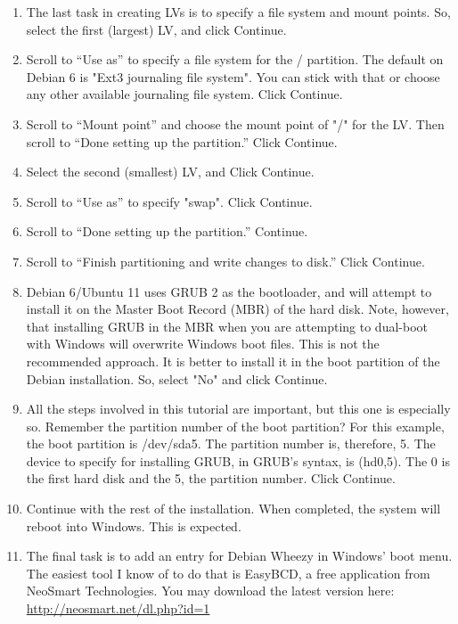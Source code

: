 \documentclass[12pt,notitlepage,onecolumn,oneside,openany]{memoir}
\begin{document}
\begin{enumerate}
\item \textsf{The last task in creating LVs is to specify a file system and mount points. So, select the first (largest) LV, and click Continue.} 

\item \textsf{Scroll to “Use as” to specify a file system for the / partition. The default on Debian 6 is "Ext3 journaling file system". You can stick with that or choose any other available journaling file system. Click Continue.}
 
\item \textsf{Scroll to “Mount point” and choose the mount point of "/" for the LV. Then scroll to “Done setting up the partition.” Click Continue.} 

\item \textsf{Select the second (smallest) LV, and Click Continue.} 

\item \textsf{Scroll to “Use as” to specify "swap". Click Continue.}

\item \textsf{Scroll to “Done setting up the partition.” Continue.} 

\item \textsf{Scroll to “Finish partitioning and write changes to disk.”  Click Continue.} 

\item \textsf{Debian 6/Ubuntu 11 uses GRUB 2 as the bootloader, and will attempt to install it on the Master Boot Record (MBR) of the hard disk. Note, however, that installing GRUB in the MBR when you are attempting to dual-boot with Windows will overwrite Windows boot files. This is not the recommended approach. It is better to install it in the boot partition of the Debian installation. So, select "No" and click Continue.} 

\item \textsf{All the steps involved in this tutorial are important, but this one is especially so. Remember the partition number of the boot partition? For this example, the boot partition is /dev/sda5. The partition number is, therefore, 5. The device to specify for installing GRUB, in GRUB’s syntax, is (hd0,5). The 0 is the first hard disk and the 5, the partition number. Click Continue.}

\item \textsf{Continue with the rest of the installation. When completed, the system will reboot into Windows. This is expected.}
 
\item \textsf{The final task is to add an entry for Debian Wheezy in Windows’ boot menu. The easiest tool I know of to do that is EasyBCD, a free application from NeoSmart Technologies. You may download the latest version here:} \newline 
      \url{http://neosmart.net/dl.php?id=1} 
      

\end{enumerate}
\end{document}
